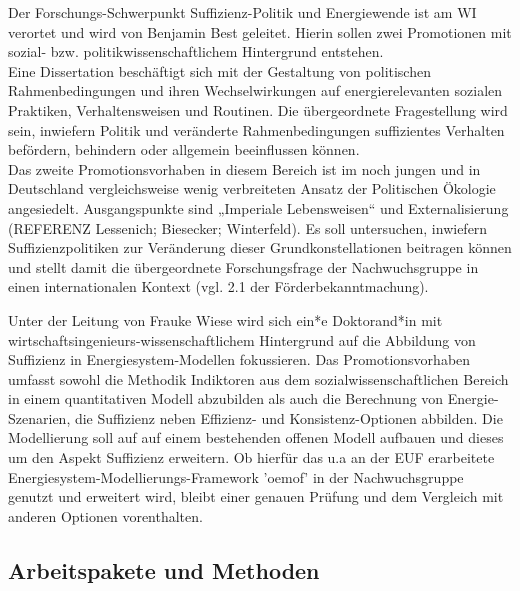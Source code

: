 \documentclass[a4paper,11pt,twoside]{scrartcl}
\begin{document}
Der Forschungs-Schwerpunkt Suffizienz-Politik und Energiewende ist am WI verortet und wird von Benjamin Best geleitet. Hierin sollen zwei Promotionen mit sozial- bzw. politikwissenschaftlichem Hintergrund entstehen.\\ 
Eine Dissertation beschäftigt sich mit der Gestaltung von politischen Rahmenbedingungen und ihren Wechselwirkungen auf energierelevanten sozialen Praktiken, Verhaltensweisen und Routinen. Die übergeordnete Fragestellung wird sein, inwiefern Politik und veränderte Rahmenbedingungen suffizientes Verhalten befördern, behindern oder allgemein beeinflussen können.\\
Das zweite Promotionsvorhaben in diesem Bereich ist im noch jungen und in Deutschland vergleichsweise wenig verbreiteten Ansatz der Politischen Ökologie angesiedelt. Ausgangspunkte sind „Imperiale Lebensweisen“ \cite{Brand2017}und Externalisierung (REFERENZ Lessenich; Biesecker; Winterfeld). Es soll untersuchen, inwiefern Suffizienzpolitiken zur Veränderung dieser Grundkonstellationen beitragen können und stellt damit die übergeordnete Forschungsfrage der Nachwuchsgruppe in einen internationalen Kontext (vgl. 2.1 der Förderbekanntmachung).

Unter der Leitung von Frauke Wiese wird sich ein*e Doktorand*in mit wirtschaftsingenieurs-wissenschaftlichem Hintergrund auf die Abbildung von Suffizienz in Energiesystem-Modellen fokussieren. Das Promotionsvorhaben umfasst sowohl die Methodik Indiktoren aus dem sozialwissenschaftlichen Bereich in einem quantitativen Modell abzubilden als auch die Berechnung von Energie-Szenarien, die Suffizienz neben Effizienz- und Konsistenz-Optionen abbilden. Die Modellierung soll auf auf einem bestehenden offenen Modell aufbauen und dieses um den Aspekt Suffizienz erweitern. Ob hierfür das u.a an der EUF erarbeitete Energiesystem-Modellierungs-Framework 'oemof' in der Nachwuchsgruppe genutzt und erweitert wird, bleibt einer genauen Prüfung und dem Vergleich mit anderen Optionen vorenthalten.

\subsection{Arbeitspakete und Methoden}
\end{document}
